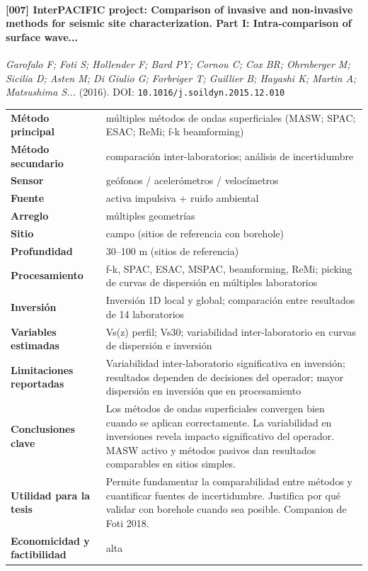 \paragraph{[007] InterPACIFIC project: Comparison of invasive and non-invasive methods for seismic site characterization. Part I: Intra-comparison of surface wave...} \emph{Garofalo F; Foti S; Hollender F; Bard PY; Cornou C; Cox BR; Ohrnberger M; Sicilia D; Asten M; Di Giulio G; Forbriger T; Guillier B; Hayashi K; Martin A; Matsushima S...} (2016).
{\scriptsize DOI: \texttt{10.1016/j.soildyn.2015.12.010}}

\begin{center}\scriptsize
\begin{tabularx}{\textwidth}{@{}>{\bfseries}p{3.3cm} X@{}}
\toprule
M\'etodo principal & múltiples métodos de ondas superficiales (MASW; SPAC; ESAC; ReMi; f-k beamforming) \\
M\'etodo secundario & comparación inter-laboratorios; análisis de incertidumbre \\
Sensor & geófonos / acelerómetros / velocímetros \\
Fuente & activa impulsiva + ruido ambiental \\
Arreglo & múltiples geometrías \\
Sitio & campo (sitios de referencia con borehole) \\
Profundidad & 30--100 m (sitios de referencia) \\
Procesamiento & f-k, SPAC, ESAC, MSPAC, beamforming, ReMi; picking de curvas de dispersión en múltiples laboratorios \\
Inversi\'on & Inversión 1D local y global; comparación entre resultados de 14 laboratorios \\
Variables estimadas & Vs(z) perfil; Vs30; variabilidad inter-laboratorio en curvas de dispersión e inversión \\
Limitaciones reportadas & Variabilidad inter-laboratorio significativa en inversión; resultados dependen de decisiones del operador; mayor dispersión en inversión que en procesamiento \\
Conclusiones clave & Los métodos de ondas superficiales convergen bien cuando se aplican correctamente. La variabilidad en inversiones revela impacto significativo del operador. MASW activo y métodos pasivos dan resultados comparables en sitios simples. \\
Utilidad para la tesis & Permite fundamentar la comparabilidad entre métodos y cuantificar fuentes de incertidumbre. Justifica por qué validar con borehole cuando sea posible. Companion de Foti 2018. \\
Economicidad y factibilidad & alta \\
\bottomrule
\end{tabularx}
\end{center}

